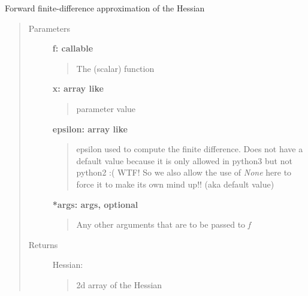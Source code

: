 \documentclass[letterpaper,10pt,english]{sphinxmanual}
\begin{document}
\begin{fulllineitems}
Forward finite-difference approximation of the Hessian
\begin{quote}\begin{description}
\item[{Parameters}] \leavevmode
\textbf{f: callable}
\begin{quote}

The (scalar) function
\end{quote}

\textbf{x: array like}
\begin{quote}

parameter value
\end{quote}

\textbf{epsilon: array like}
\begin{quote}

epsilon used to compute the finite difference.  Does not 
have a default value because it is only allowed in 
python3 but not python2 :( WTF!  So we also allow the
use of \emph{None} here to force it to make its own mind
up!! (aka default value)
\end{quote}

\textbf{*args: args, optional}
\begin{quote}

Any other arguments that are to be passed to \emph{f}
\end{quote}

\item[{Returns}] \leavevmode
Hessian: \href{http://docs.scipy.org/doc/numpy/reference/generated/numpy.ndarray.html\#numpy.ndarray}{}
\begin{quote}

2d array of the Hessian
\end{quote}

\end{description}\end{quote}

\end{fulllineitems}
\end{document}
